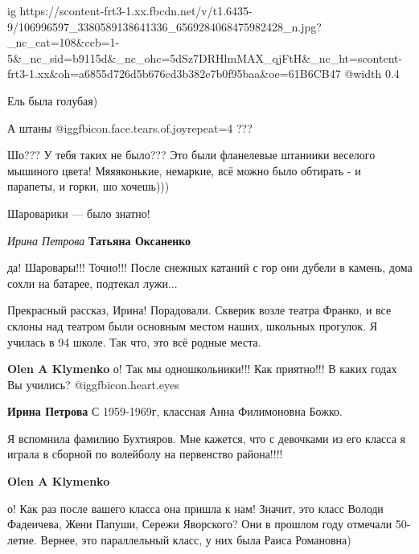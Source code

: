  
 
 
 
 

\ifcmt
  ig https://scontent-frt3-1.xx.fbcdn.net/v/t1.6435-9/106996597_3380589138641336_6569284068475982428_n.jpg?_nc_cat=108&ccb=1-5&_nc_sid=b9115d&_nc_ohc=5dSz7DRHlmMAX_qjFtH&_nc_ht=scontent-frt3-1.xx&oh=a6855d726d5b676cd3b382e7b0f95baa&oe=61B6CB47
  @width 0.4
\fi

Ель была голубая)

А штаны  @igg{fbicon.face.tears.of.joy}{repeat=4} ???


Шо??? У тебя таких не было??? Это были фланелевые штаниики веселого мышиного
цвета! Мяяяконькие, немаркие, всё можно было обтирать - и парапеты, и горки, шо
хочешь)))

Шароварики — было знатно!

\emph{Ирина Петрова}
\textbf{Татьяна Оксаненко} 

да! Шаровары!!! Точно!!! После снежных катаний с гор они дубели в камень, дома
сохли на батарее, подтекал лужи...


Прекрасный рассказ, Ирина! Порадовали. Скверик возле театра Франко, и все
склоны над театром были основным местом наших, школьных прогулок. Я училась в
94 школе. Так что, это всё родные места.

\textbf{Olen A Klymenko} о! Так мы одношкольники!!! Как приятно!!! В каких годах Вы учились? @igg{fbicon.heart.eyes} 

\textbf{Ирина Петрова} С 1959-1969г, классная Анна Филимоновна Божко.


Я вспомнила фамилию Бухтияров. Мне кажется, что с девочками из его класса я
играла в сборной по волейболу на первенство района!!!!

\textbf{Olen A Klymenko} 

о! Как раз после вашего класса она пришла к нам! Значит, это класс Володи
Фадеичева, Жени Папуши, Сережи Яворского? Они в прошлом году отмечали 50-летие.
Вернее, это параллельный класс, у них была Раиса Романовна)

